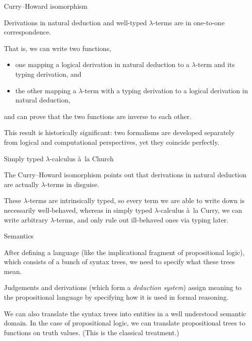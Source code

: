\documentclass[t,compress,hyperref={hidelinks}]{beamer}
\begin{document}
\begin{frame}{Curry--Howard isomorphism}

Derivations in natural deduction and well-typed $\lambda$-terms are in one-to-one correspondence.

That is, we can write two functions,
\begin{itemize}
\item one mapping a logical derivation in natural deduction to a $\lambda$-term and its typing derivation, and
\item the other mapping a $\lambda$-term with a typing derivation to a logical derivation in natural deduction,
\end{itemize}
and can prove that the two functions are inverse to each other.

This result is historically significant: two formalisms are developed separately from logical and computational perspectives, yet they coincide perfectly.

\end{frame}

\begin{frame}{Simply typed $\lambda$-calculus à~la Church}

The Curry--Howard isomorphism points out that derivations in natural deduction are actually $\lambda$-terms in disguise.

These $\lambda$-terms are intrinsically typed, so every term we are able to write down is necessarily well-behaved, whereas in simply typed $\lambda$-calculus à~la Curry, we can write arbitrary $\lambda$-terms, and only rule out ill-behaved ones via typing later.

\end{frame}

\begin{frame}{Semantics}

After defining a language (like the implicational fragment of propositional logic), which consists of a bunch of syntax trees, we need to specify what these trees mean.

Judgements and derivations (which form a \emph{deduction system}) assign meaning to the propositional language by specifying how it is used in formal reasoning.

We can also translate the syntax trees into entities in a well understood semantic domain.
In the case of propositional logic, we can translate propositional trees to functions on truth values. (This is the classical treatment.)

\end{frame}
\end{document}
